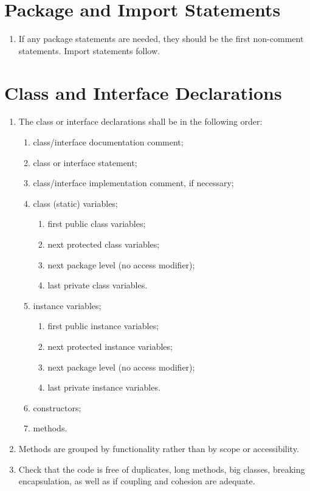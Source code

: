 \section*{Package and Import Statements}\begin{enumerate}[resume]
\item If any package statements are needed, they should be the first non-comment statements. Import statements follow.
\end{enumerate}

\section*{Class and Interface Declarations}\begin{enumerate}[resume]
\item The class or interface declarations shall be in the following order:
	\begin{enumerate}
		\item class/interface documentation comment;
		\item class or interface statement;
		\item class/interface implementation comment, if necessary;
		\item class (static) variables;
		\begin{enumerate}
			\item first public class variables;
			\item next protected class variables;
			\item next package level (no access modifier);
			\item last private class variables.
		\end{enumerate}
		\item instance variables;
		\begin{enumerate}
			\item first public instance variables;
			\item next protected instance variables;
			\item next package level (no access modifier);
			\item last private instance variables.
		\end{enumerate}
		\item constructors;
		\item methods.
	\end{enumerate}
	\item Methods are grouped by functionality rather than by scope or accessibility.
	\item Check that the code is free of duplicates, long methods, big classes, breaking encapsulation, as well as if coupling and cohesion are adequate.
\end{enumerate}

